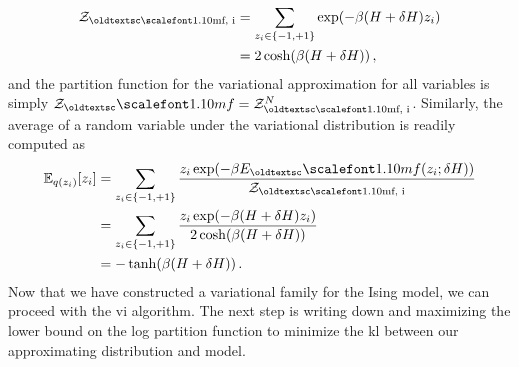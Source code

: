 \begin{align}
  \cZ_\textrm{\mf, i} &= \sum_{z_i \in \{-1, +1\}} \exp(- \beta (H + \delta H) z_i) \\
  &= 2 \cosh (\beta (H + \delta H)) \, ,
  \label{eq:partition-function-i}
\end{align}
and the partition function for the variational approximation for all variables is simply $\cZ_\mf = \cZ_\textrm{\mf, i}^N$. Similarly, the average of a random variable under the variational distribution is readily computed as
\begin{align}
\begin{split}
  \E_{q(z_i)}[z_i] &= \sum_{z_i \in \{-1, +1\}} \frac{z_i \exp(- \beta E_\mf(z_i; \delta H))}{\cZ_\textrm{\mf, i}} \\
 &= \sum_{z_i \in \{-1, +1\}} \frac{z_i \exp(- \beta (H + \delta H) z_i)}{2 \cosh(\beta (H + \delta H))} \\
 &= -\tanh(\beta (H + \delta H))\, .
 \label{eq:mf-mean}
 \end{split}
\end{align}
Now that we have constructed a variational family for the Ising model, we can proceed with the \gls{vi} algorithm. The next step is writing down and maximizing the lower bound on the log partition function to minimize the \gls{kl} between our approximating distribution and model.

